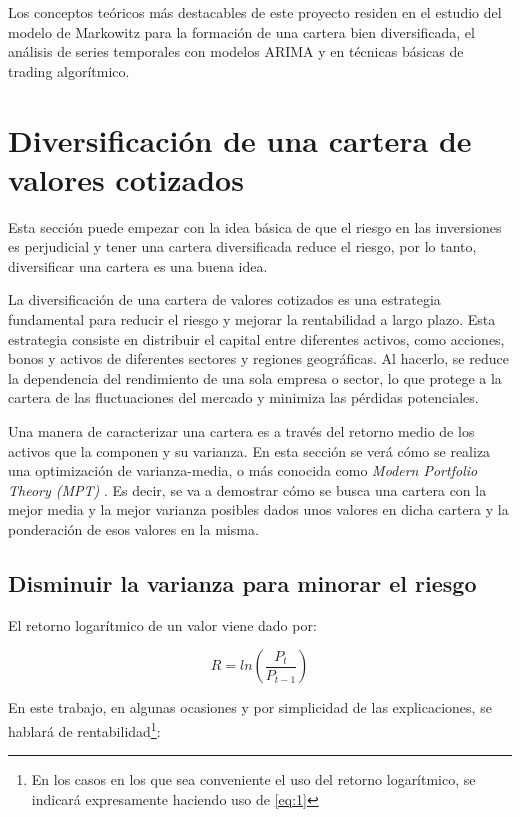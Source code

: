 
Los conceptos teóricos más destacables de este proyecto residen en el estudio del modelo de Markowitz para la formación de una cartera bien diversificada, el análisis de series temporales con modelos ARIMA y en técnicas básicas de trading algorítmico. 


\section{Diversificación de una cartera de valores cotizados}\label{diversificar_cartera}

Esta sección puede empezar con la idea básica de que el riesgo en las inversiones es perjudicial y tener una cartera diversificada reduce el riesgo, por lo tanto, diversificar una cartera es una buena idea. 

La diversificación de una cartera de valores cotizados es una estrategia fundamental para reducir el riesgo y mejorar la rentabilidad a largo plazo. Esta estrategia consiste en distribuir el capital entre diferentes activos, como acciones, bonos y activos de diferentes sectores y regiones geográficas. Al hacerlo, se reduce la dependencia del rendimiento de una sola empresa o sector, lo que protege a la cartera de las fluctuaciones del mercado y minimiza las pérdidas potenciales.

Una manera de caracterizar una cartera es a través del retorno medio de los activos que la componen y su varianza. En esta sección se verá cómo se realiza una optimización de varianza-media, o más conocida como \emph{Modern Portfolio Theory (MPT)} \citep{wiki:mpt}. Es decir, se va a demostrar cómo se busca una cartera con la mejor media y la mejor varianza posibles dados unos valores en dicha cartera y la ponderación de esos valores en la misma. 


\subsection{Disminuir la varianza para minorar el riesgo}

El retorno logarítmico de un valor viene dado por:

\begin{equation} \label{eq:1}
	R = ln(\frac{P_{t}}{P_{t-1}})
\end{equation}

En este trabajo, en algunas ocasiones y por simplicidad de las explicaciones, se hablará de rentabilidad\footnote{En los casos en los que sea conveniente el uso del retorno logarítmico, se indicará expresamente haciendo uso de \ref{eq:1}}:

